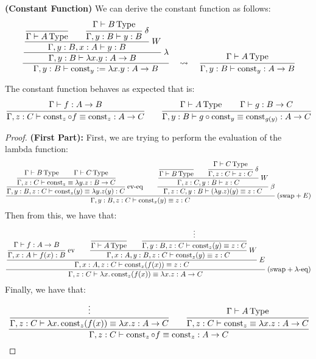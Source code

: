 \begin{definition}{\textbf{(Constant Function)}}
    \label{def:const-funct}
    We can derive the constant function as follows:
    \begin{equation*}
        \cfrac{\cfrac{\cfrac{\cfrac{}{\Gamma\vdash A\type}\qquad\cfrac{\Gamma\vdash B\type}{\Gamma, y:B\vdash y:B}\ \delta}{\Gamma, y:B, x:A\vdash y:B}\ W}{\Gamma, y:B\vdash \lambda x.y:A\to B}\ \lambda}{\Gamma, y:B\vdash\operatorname{const}_y:=\lambda x.y:A\to B}\quad \rightsquigarrow\quad \cfrac{\Gamma\vdash A\type}{\Gamma, y:B\vdash\operatorname{const}_y:A\to B}
    \end{equation*}
\end{definition}

\begin{lemma}
    \label{lemma:const-funct-compose}
    The constant function behaves as expected that is:
    \begin{equation*}
        \cfrac{\Gamma\vdash f:A\to B}{\Gamma, z:C\vdash \operatorname{const}_z\circ f\equiv\operatorname{const}_z:A\to C} \qquad \cfrac{\Gamma\vdash A\operatorname{Type} \qquad \Gamma\vdash g:B\to C}{\Gamma, y:B\vdash g\circ \operatorname{const}_y\equiv\operatorname{const}_{g(y)}:A\to C}
    \end{equation*}
\end{lemma}

\begin{proof}{\textbf{(First Part):}}
    First, we are trying to perform the evaluation of the lambda function:
    \begin{equation*}
        \cfrac{
            \cfrac{\cfrac{\Gamma\vdash B\type \qquad \Gamma\vdash C\type}{\Gamma, z:C\vdash\operatorname{const}_z\equiv\lambda y.z:B\to C}}{\Gamma, y:B, z:C\vdash\operatorname{const}_z(y)\equiv\lambda y.z(y):C}\text{ ev-eq}
            \qquad \cfrac{\cfrac{\cfrac{}{\Gamma\vdash B\type}\qquad \cfrac{\Gamma\vdash C\type}{\Gamma,z:C\vdash z:C} \ \delta}{\Gamma, z:C, y:B\vdash z:C} \ W}{\Gamma, z:C, y:B\vdash(\lambda y.z)(y)\equiv z:C}\ \beta
        }{\Gamma, y:B, z:C\vdash\operatorname{const}_z(y)\equiv z:C} \ (\text{swap}+E)
    \end{equation*}
    Then from this, we have that:
    \begin{equation*}
        \cfrac{\cfrac{\cfrac{\Gamma\vdash f:A\to B}{\Gamma, x:A\vdash f(x):B}\ \text{ev}\qquad \cfrac{\cfrac{}{\Gamma\vdash A\type}\qquad \cfrac{\vdots}{\Gamma, y:B, z:C\vdash\operatorname{const}_z(y)\equiv z:C}}{\Gamma, x:A, y:B, z:C\vdash\operatorname{const}_z(y)\equiv z:C} \ W}{\Gamma, x:A,z:C\vdash\operatorname{const}_z(f(x))\equiv z:C} \ E}{\Gamma,z:C\vdash\lambda x.\operatorname{const}_z(f(x))\equiv\lambda x.z:A\to C}\ (\text{swap}+\lambda\text{-eq})
    \end{equation*}
    Finally, we have that:
    \begin{equation*}
        \cfrac{\cfrac{\vdots}{\Gamma,z:C\vdash\lambda x.\operatorname{const}_z(f(x))\equiv\lambda x.z:A\to C}\qquad\cfrac{\Gamma\vdash A\operatorname{Type}}{\Gamma, z:C\vdash\operatorname{const}_z\equiv\lambda x.z:A\to C}}{\Gamma, z:C\vdash\operatorname{const}_z\circ f\equiv\operatorname{const}_z:A\to C}
    \end{equation*}
\end{proof}


